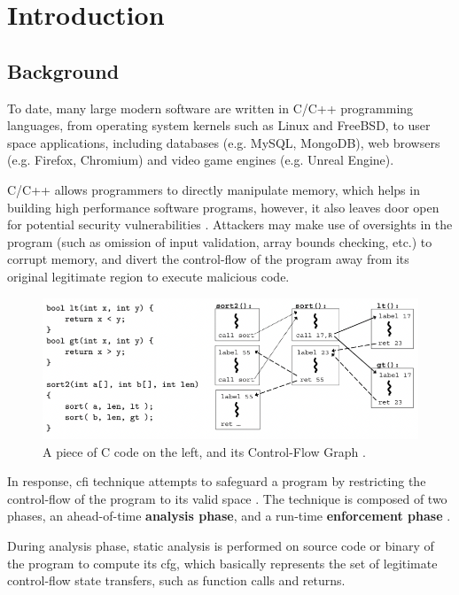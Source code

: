 \chapter{Introduction}

\section{Background}
\label{section:background}

To date, many large modern software are written in C/C++ programming languages, from operating system kernels such as Linux and FreeBSD, to user space applications, including databases (e.g. MySQL, MongoDB), web browsers (e.g. Firefox, Chromium) and video game engines (e.g. Unreal Engine).

C/C++ allows programmers to directly manipulate memory, which helps in building high performance software programs, however, it also leaves door open for potential security vulnerabilities \cite{BurowNathan2017CIPS}. Attackers may make use of oversights in the program (such as omission of input validation, array bounds checking, etc.) to corrupt memory, and divert the control-flow of the program away from its original legitimate region to execute malicious code.

\begin{figure}[ht]
    \centering
    \includegraphics[keepaspectratio,width=0.65\paperwidth]{img/cfg.png}
    \caption{A piece of C code on the left, and its Control-Flow Graph \cite{cfi2005}.}
    \label{fig:cfg}
\end{figure}

In response, \ac{cfi} technique \cite{cfi2005} attempts to safeguard a program by restricting the control-flow of the program to its valid space \cite{nebelwelt}. The technique is composed of two phases, an ahead-of-time \textbf{analysis phase}, and a run-time \textbf{enforcement phase} \cite{BurowNathan2017CIPS}.

During analysis phase, static analysis is performed on source code or binary of the program to compute its \ac{cfg}, which basically represents the set of legitimate control-flow state transfers, such as function calls and returns.


